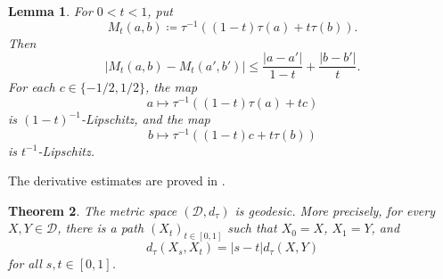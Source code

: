 \documentclass[11pt]{amsart}
\theoremstyle{plain}
\newtheorem{theorem}{Theorem}[section]
\newtheorem{lemma}[theorem]{Lemma}
\theoremstyle{definition}
\theoremstyle{remark}
\newcommand{\D}{\mathcal D}
\newcommand{\dtau}{d_{\tau}}
\begin{document}
\begin{lemma}
\label{lem:scalar-interpolation}
For $0<t<1$, put
\[
M_t(a,b)\coloneqq\tau^{-1}((1-t)\tau(a)+t\tau(b)).
\]
Then
\[
|M_t(a,b)-M_t(a',b')|
\leq\frac{|a-a'|}{1-t}+\frac{|b-b'|}{t}.
\]
For each $c\in\{-1/2,1/2\}$, the map
\[
a\longmapsto\tau^{-1}((1-t)\tau(a)+tc)
\]
is $(1-t)^{-1}$-Lipschitz, and the map
\[
b\longmapsto\tau^{-1}((1-t)c+t\tau(b))
\]
is $t^{-1}$-Lipschitz.
\end{lemma}

The derivative estimates are proved in .

\begin{theorem}
\label{thm:dtau-geodesic}
The metric space $(\D,\dtau)$ is geodesic. More precisely, for every $X,Y\in\D$, there is a path $(X_t)_{t\in[0,1]}$ such that $X_0=X$, $X_1=Y$, and
\[
\dtau(X_s,X_t)=|s-t|\dtau(X,Y)
\]
for all $s,t\in[0,1]$.
\end{theorem}
\end{document}
